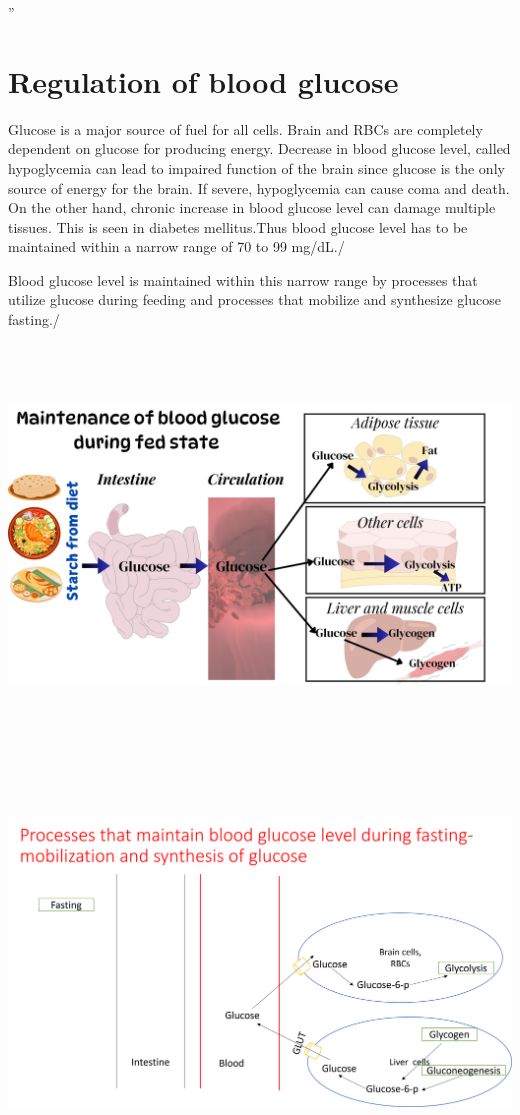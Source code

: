 \documentclass[
]{book}
\begin{document}
''

\chapter{Regulation of blood glucose}\label{regulation-of-blood-glucose}

Glucose is a major source of fuel for all cells. Brain and RBCs are completely dependent on glucose for producing energy. Decrease in blood glucose level, called hypoglycemia can lead to impaired function of the brain since glucose is the only source of energy for the brain. If severe, hypoglycemia can cause coma and death. On the other hand, chronic increase in blood glucose level can damage multiple tissues. This is seen in diabetes mellitus.Thus blood glucose level has to be maintained within a narrow range of 70 to 99 mg/dL./

Blood glucose level is maintained within this narrow range by processes that utilize glucose during feeding and processes that mobilize and synthesize glucose fasting./

\includegraphics[width=\textwidth,height=4.16667in]{Images/feeding.png}

\includegraphics[width=\textwidth,height=4.16667in]{Images/fasting.png}
\end{document}
